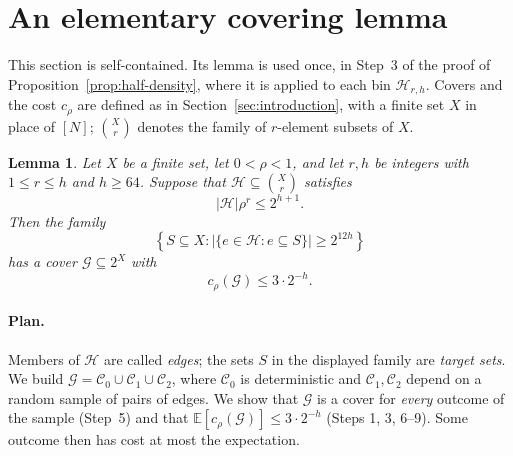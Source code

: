 \documentclass[11pt,letterpaper]{article}
\newtheorem{lemma}[theorem]{Lemma}
\theoremstyle{definition}
\theoremstyle{remark}
\numberwithin{equation}{section}
\begin{document}
\section{An elementary covering lemma}
\label{sec:covering}

This section is self-contained. Its lemma is used once, in Step~3 of the proof
of Proposition~\ref{prop:half-density}, where it is applied to each bin
$\mathcal H_{r,h}$. Covers and the cost $c_\rho$ are defined as in
Section~\ref{sec:introduction}, with a finite set $X$ in place of $[N]$;
$\binom Xr$ denotes the family of $r$-element subsets of $X$.

\begin{lemma}\label{lem:covering}
Let \(X\) be a finite set, let \(0<\rho<1\), and let \(r,h\) be integers
with \(1\le r\le h\) and \(h\ge64\). Suppose that
\(\mathcal H\subseteq\binom{X}{r}\) satisfies
\[
|\mathcal H|\rho^r\le2^{h+1}.
\]
Then the family
\[
\left\{S\subseteq X:
  |\{e\in\mathcal H:e\subseteq S\}|\ge2^{12h}\right\}
\]
has a cover \(\mathcal G\subseteq2^X\) with
\[
c_\rho(\mathcal G)\le3\cdot2^{-h}.
\]
\end{lemma}

\paragraph{Plan.}
Members of $\mathcal H$ are called \emph{edges}; the sets $S$ in the displayed
family are \emph{target sets}. We build
$\mathcal G=\mathcal C_0\cup\mathcal C_1\cup\mathcal C_2$, where
$\mathcal C_0$ is deterministic and $\mathcal C_1,\mathcal C_2$ depend on a
random sample of pairs of edges. We show that $\mathcal G$ is a cover for
\emph{every} outcome of the sample (Step~5) and that
$\mathbb E[c_\rho(\mathcal G)]\le3\cdot2^{-h}$ (Steps 1, 3, 6--9). Some
outcome then has cost at most the expectation.
\end{document}
